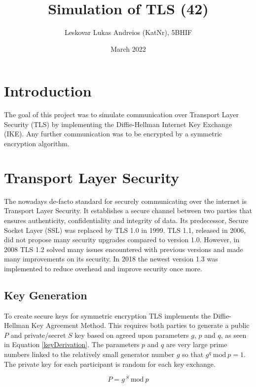 \documentclass[12pt, letterpaper]{article}
\title{Simulation of TLS (42)}
\author{Leskovar Lukas Andreios (KatNr), 5BHIF}
\date{March 2022}
\begin{document}
\begin{titlepage}
\maketitle
\end{titlepage}

\tableofcontents
\newpage

\section{Introduction}
The goal of this project was to simulate communication over Transport Layer Security (TLS) by implementing the Diffie-Hellman Internet Key Exchange (IKE). Any further communication was to be encrypted by a symmetric encryption algorithm.

\section{Transport Layer Security}
The nowadays de-facto standard for securely communicating over the internet is Transport Layer Security. It establishes a secure channel between two parties that ensures authenticity, confidentiality and integrity of data.
Its predecessor, Secure Socket Layer (SSL) was replaced by TLS 1.0 in 1999. 
TLS 1.1, released in 2006, did not propose many security upgrades compared to version 1.0. However, in 2008 TLS 1.2 solved many issues encountered with previous versions and made many improvements on its security.
In 2018 the newest version 1.3 was implemented to reduce overhead and improve security once more.

\subsection{Key Generation}
To create secure keys for symmetric encryption TLS implements the Diffie-Hellman Key Agreement Method. This requires both parties to generate a public $P$ and private/secret $S$ key based on agreed upon parameters $g$, $p$ and $q$, as seen in Equation \ref{keyDerivation}. The parameters $p$ and $q$ are very large prime numbers linked to the relatively small generator number $g$ so that $g^{q}\ \mathrm{mod}\ p = 1$. The private key for each participant is random for each key exchange. \cite{dierks1999rfc2246}

\begin{equation}\label{keyDerivation}
	P = g^{ \ S}\ \mathrm{mod}\ p
\end{equation}
\end{document}
